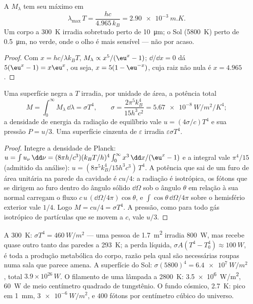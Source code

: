 \begin{proposition}\label{prop:b2:thermal-radiation:wien}
A  $M_\lambda$ tem seu máximo em
\[
\lambda_{\max}\,T = \frac{hc}{4.965\,k_B} = \qty{2.90e-3}{m.K} .
\]
Um corpo a \qty{300}{K} irradia sobretudo perto de \qty{10}{\micro m}; o Sol
(\qty{5800}{K}) perto de \qty{0.5}{\micro m}, no verde, onde o olho é
mais sensível --- não por acaso.
\end{proposition}

\begin{proof}
Com $x = hc/\lambda k_BT$, $M_\lambda \propto x^5/(\eu^x - 1)$; $\dd/\dd x = 0$
dá $5(\eu^x - 1) = x\eu^x$, ou seja, $x = 5(1 - \eu^{-x})$, cuja raiz
não nula é $x = 4.965$.
\end{proof}

\begin{theorem}\label{thm:b2:thermal-radiation:stefan}
Uma superfície negra a $T$ irradia, por unidade de área, a potência total
\[
M = \int_0^\infty M_\lambda\,\dd\lambda = \sigma T^4, \qquad
\sigma = \frac{2\pi^5k_B^4}{15h^3c^2} = \qty{5.67e-8}{W/m^2/K^4} ;
\]
a densidade de energia da radiação de equilíbrio vale $u = (4\sigma/c)T^4$
e sua pressão $P = u/3$. Uma superfície cinzenta de  $\varepsilon$
irradia $\varepsilon\sigma T^4$.
\end{theorem}

\begin{proof}
Integre a densidade de Planck: $u = \int u_\nu\,\dd\nu = (8\pi h/c^3)(k_BT/h)^4
\int_0^\infty x^3\,\dd x/(\eu^x - 1)$ e a integral vale $\pi^4/15$
(admitido da análise): $u = (8\pi^5k_B^4/15h^3c^3)\,T^4$. A potência
que sai de um furo de área unitária na parede da cavidade é $cu/4$: a
radiação é isotrópica, os fótons que se dirigem ao furo dentro do
ângulo sólido $\dd\Omega$ sob o ângulo $\theta$ em relação à sua normal carregam o
fluxo $c\,u\,(\dd\Omega/4\pi)\cos\theta$, e $\int\cos\theta\,\dd\Omega/4\pi$
sobre o hemisfério exterior vale $1/4$. Logo $M = cu/4 = \sigma T^4$.
A pressão, como para todo gás isotrópico de partículas que se movem a $c$, vale
$u/3$.
\end{proof}

\begin{example}\label{ex:b2:thermal-radiation:orders}
A \qty{300}{K}: $\sigma T^4 = \qty{460}{W/m^2}$ --- uma pessoa de
\qty{1.7}{m^2} irradia \qty{800}{W}, mas recebe quase outro tanto das
paredes a \qty{293}{K}; a perda líquida, $\sigma A(T^4 - T_0^4) \approx
\qty{100}{W}$, é toda a produção metabólica do corpo, razão pela qual são
necessárias roupas numa sala que parece amena. A superfície do Sol: $\sigma
(5800)^4 = \qty{6.4e7}{W/m^2}$, total $3.9 \times 10^{26}\,\unit{W}$. O
filamento de uma lâmpada a \qty{2800}{K}: \qty{3.5e6}{W/m^2}, \qty{60}{W} de meio
centímetro quadrado de tungstênio. O fundo cósmico, \qty{2.7}{K}:
pico em \qty{1}{mm}, $\qty{3e-6}{W/m^2}$, e $400$ fótons por centímetro
cúbico do universo.
\end{example}

